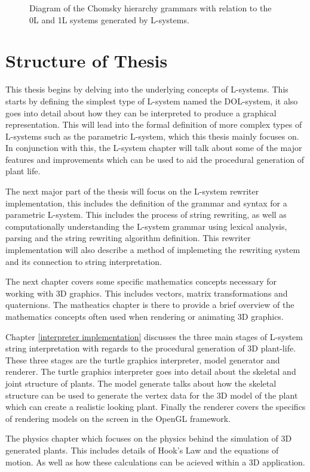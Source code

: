 \begin{figure}[htbp]
	{\centering
		\setlength{\fboxrule}{1pt}
		\vspace{7px}
		\caption{Diagram of the Chomsky hierarchy grammars with relation to the 0L and 1L systems generated by L-systems.} \label{chomsky grammars}
	}
\end{figure}
\FloatBarrier

\section{Structure of Thesis}

This thesis begins by delving into the underlying concepts of L-systems. This starts by defining the simplest type of L-system named the DOL-system, it also goes into detail about how they can be interpreted to produce a graphical representation. This will lead into the formal definition of more complex types of L-systems such as the parametric L-system, which this thesis mainly focuses on. In conjunction with this, the L-system chapter will talk about some of the major features and improvements which can be used to aid the procedural generation of plant life. 

The next major part of the thesis will focus on the L-system rewriter implementation, this includes the definition of the grammar and syntax for a parametric L-system. This includes the process of string rewriting, as well as computationally understanding the L-system grammar using lexical analysis, parsing and the string rewriting algorithm definition. This rewriter implementation will also describe a method of implemeting the rewriting system and its connection to string interpretation.

The next chapter covers some specific mathematics concepts necessary for working with 3D graphics. This includes vectors, matrix transformations and quaternions. The matheatics chapter is there to provide a brief overview of the mathematics concepts often used when rendering or animating 3D graphics.  

Chapter \ref{interpreter implementation} discusses the three main stages of L-system string interpretation with regards to the procedural generation of 3D plant-life. These three stages are the turtle graphics interpreter, model generator and renderer. The turtle graphics interpreter goes into detail about the skeletal and joint structure of plants. The model generate talks about how the skeletal structure can be used to generate the vertex data for the 3D model of the plant which can create a realistic looking plant. Finally the renderer covers the specifics of rendering models on the screen in the OpenGL framework.

The physics chapter which focuses on the physics behind the simulation of 3D generated plants. This includes details of Hook's Law and the equations of motion. As well as how these calculations can be acieved within a 3D application.





